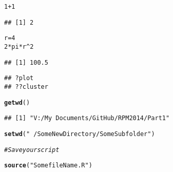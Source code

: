 \documentclass[xcolor=dvipsnames]{beamer}
\makeatletter
\newcommand{\hlnum}[1]{\textcolor[rgb]{0.686,0.059,0.569}{#1}}%
\newcommand{\hlstr}[1]{\textcolor[rgb]{0.192,0.494,0.8}{#1}}%
\newcommand{\hlcom}[1]{\textcolor[rgb]{0.678,0.584,0.686}{\textit{#1}}}%
\newcommand{\hlopt}[1]{\textcolor[rgb]{0,0,0}{#1}}%
\newcommand{\hlstd}[1]{\textcolor[rgb]{0.345,0.345,0.345}{#1}}%
\newcommand{\hlkwb}[1]{\textcolor[rgb]{0.69,0.353,0.396}{#1}}%
\newcommand{\hlkwd}[1]{\textcolor[rgb]{0.737,0.353,0.396}{\textbf{#1}}}%
\newenvironment{kframe}{%
 \def\at@end@of@kframe{}%
 \ifinner\ifhmode%
  \def\at@end@of@kframe{\end{minipage}}%
  \begin{minipage}{\columnwidth}%
 \fi\fi%
 \def\FrameCommand##1{\hskip\@totalleftmargin \hskip-\fboxsep
 \colorbox{shadecolor}{##1}\hskip-\fboxsep
     \hskip-\linewidth \hskip-\@totalleftmargin \hskip\columnwidth}%
 \MakeFramed {\advance\hsize-\width
   \@totalleftmargin\z@ \linewidth\hsize
   \@setminipage}}%
 {\par\unskip\endMakeFramed%
 \at@end@of@kframe}
\newenvironment{knitrout}{}{} %
\makeatother
\begin{document}
\begin{frame}[fragile]
\begin{knitrout}\tiny
{}\color{fgcolor}\begin{kframe}
\begin{alltt}
\hlnum{1} \hlopt{+} \hlnum{1}
\end{alltt}
\begin{verbatim}
## [1] 2
\end{verbatim}
\begin{alltt}
\hlstd{r} \hlkwb{=} \hlnum{4}
\hlnum{2} \hlopt{*} \hlstd{pi} \hlopt{*} \hlstd{r}\hlopt{^}\hlnum{2}
\end{alltt}
\begin{verbatim}
## [1] 100.5
\end{verbatim}
\end{kframe}
\end{knitrout}

\begin{knitrout}\tiny
{}\color{fgcolor}\begin{kframe}
\begin{verbatim}
## ?plot
## ??cluster
\end{verbatim}
\end{kframe}
\end{knitrout}

\begin{knitrout}\tiny
{}\color{fgcolor}\begin{kframe}
\begin{alltt}
\hlkwd{getwd}\hlstd{()}
\end{alltt}
\begin{verbatim}
## [1] "V:/My Documents/GitHub/RPM2014/Part1"
\end{verbatim}
\end{kframe}
\end{knitrout}

\begin{knitrout}\tiny
{}\color{fgcolor}\begin{kframe}
\begin{alltt}
\hlkwd{setwd}\hlstd{(}\hlstr{"~/SomeNewDirectory/SomeSubfolder"}\hlstd{)}

\hlcom{# Save your script}

\hlkwd{source}\hlstd{(}\hlstr{"SomefileName.R"}\hlstd{)}
\end{alltt}
\end{kframe}
\end{knitrout}

\end{frame}
\end{document}
